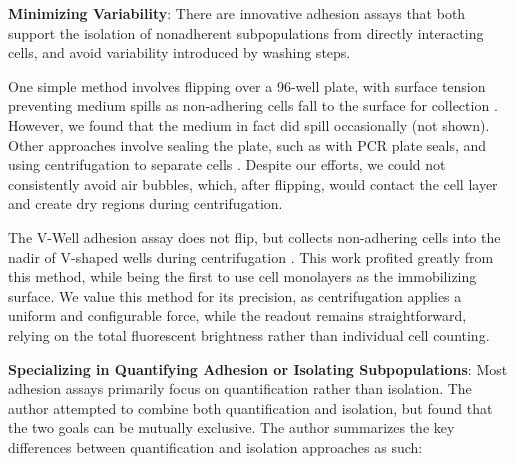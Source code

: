 \textbf{Minimizing Variability}:
There are innovative adhesion assays that both
support the isolation of nonadherent subpopulations from directly interacting
cells, and avoid variability introduced by washing steps.

One simple method involves flipping over a 96-well plate, with surface tension
preventing medium spills as non-adhering cells fall to the surface for
collection \cite{zepeda-morenoInnovativeMethodQuantification2011}. However, we
found that the medium in fact did spill occasionally (not shown). Other
approaches involve sealing the plate, such as with PCR plate seals, and using
centrifugation to separate cells \cite{reyesCentrifugationCellAdhesion2003,
    chenHighThroughputScreeningTest2021}. Despite our efforts, we could not
consistently avoid air bubbles, which, after flipping, would contact the cell
layer and create dry regions during centrifugation.

The V-Well adhesion assay does not flip, but collects non-adhering cells into
the nadir of V-shaped wells during centrifugation
\cite{weetallHomogeneousFluorometricAssay2001}. This work profited greatly from
this method, while  being the first to use cell
monolayers as the immobilizing surface. We value this method for its precision,
as centrifugation applies a uniform and configurable force, while the readout
remains straightforward, relying on the total fluorescent brightness rather than
individual cell counting.




\textbf{Specializing in Quantifying Adhesion or Isolating Subpopulations}: Most
adhesion assays primarily focus on quantification rather than isolation. The
author attempted to combine both quantification and isolation, but found that
the two goals can be mutually exclusive. The author summarizes the key
differences between quantification and isolation approaches as such:


